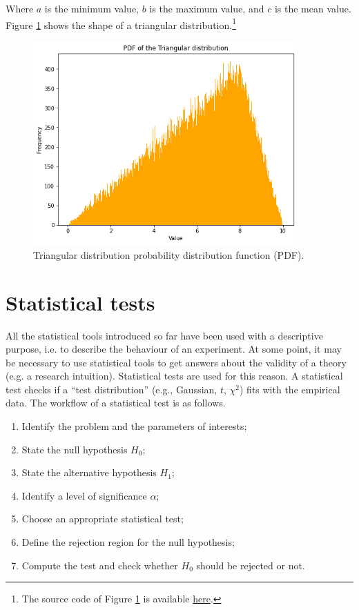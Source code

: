 Where $a$ is the minimum value, $b$ is the maximum value, and $c$ is the mean value. Figure \ref{fig_triangular} shows the shape of a triangular distribution.\footnote{The source code of Figure \ref{fig_triangular} is available \href{https://github.com/aletuf93/logproj/blob/master/examples/03.\%20Statistics.ipynb}{here}.
}

\begin{figure}[hbt!]
\centering
\includegraphics[width=0.9\textwidth]{SectionLetsMath/elemStat_figures/fig_triangular.png}
\captionsetup{type=figure}
\caption{Triangular distribution probability distribution function (PDF).}
\label{fig_triangular}
\end{figure}

\section{Statistical tests} \label{secStatTest}

All the statistical tools introduced so far have been used with a descriptive purpose, i.e. to describe the behaviour of an experiment. At some point, it may be necessary to use statistical tools to get answers about the validity of a theory (e.g. a research intuition). Statistical tests are used for this reason. A statistical test checks if a “test distribution” (e.g., Gaussian, $t$, $\chi^2$) fits with the empirical data. The workflow of a statistical test is as follows.
\begin{enumerate}
    \item Identify the problem and the parameters of interests;
    \item State the null hypothesis $H_0$;
    \item State the alternative hypothesis $H_1$;
    \item Identify a level of significance $\alpha$;
    \item Choose an appropriate statistical test;
    \item Define the rejection region for the null hypothesis;
    \item Compute the test and check whether $H_0$ should be rejected or not.
\end{enumerate}

